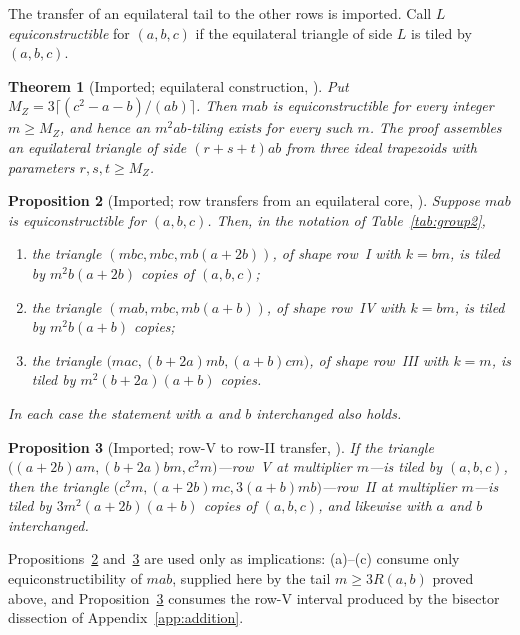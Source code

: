 \documentclass[11pt]{amsart}
\newtheorem{theorem}{Theorem}
\newtheorem{proposition}[theorem]{Proposition}
\theoremstyle{definition}
\theoremstyle{remark}
\begin{document}
The transfer of an equilateral tail to the other rows is imported.  Call
$L$ \emph{equiconstructible} for $(a,b,c)$ if the equilateral triangle of
side $L$ is tiled by $(a,b,c)$.

\begin{theorem}[Imported; equilateral construction,
{\cite[Thm.~4]{Zhang25}}]\label{thm:imp-zhang4}
Put $M_Z=3\lceil(c^2-a-b)/(ab)\rceil$.  Then $mab$ is equiconstructible for
every integer $m\ge M_Z$, and hence an $m^2ab$-tiling exists for every such
$m$.  The proof assembles an equilateral triangle of side $(r+s+t)ab$ from
three ideal trapezoids with parameters $r,s,t\ge M_Z$.
\end{theorem}

\begin{proposition}[Imported; row transfers from an equilateral core,
{\cite[Props.~8--10]{Zhang25}}]\label{prop:imp-zhang810}
Suppose $mab$ is equiconstructible for $(a,b,c)$.  Then, in the notation of
Table~\ref{tab:group2},
\begin{enumerate}[label=\textup{(\alph*)}]
\item \textup{\cite[Prop.~8(1)]{Zhang25}} the triangle
      $(mbc,mbc,mb(a+2b))$, of shape row~I with $k=bm$, is tiled by
      $m^2b(a+2b)$ copies of $(a,b,c)$;
\item \textup{\cite[Prop.~9(1)]{Zhang25}} the triangle
      $(mab,mbc,mb(a+b))$, of shape row~IV with $k=bm$, is tiled by
      $m^2b(a+b)$ copies;
\item \textup{\cite[Prop.~10(1)]{Zhang25}} the triangle
      $\bigl(mac,(b+2a)mb,(a+b)cm\bigr)$, of shape row~III with $k=m$, is
      tiled by $m^2(b+2a)(a+b)$ copies.
\end{enumerate}
In each case the statement with $a$ and $b$ interchanged also holds.
\end{proposition}

\begin{proposition}[Imported; row-V to row-II transfer,
{\cite[Prop.~11]{Zhang25}}]\label{prop:imp-zhang11}
If the triangle $\bigl((a+2b)am,(b+2a)bm,c^2m\bigr)$---row~V at multiplier
$m$---is tiled by $(a,b,c)$, then the triangle
$\bigl(c^2m,(a+2b)mc,3(a+b)mb\bigr)$---row~II at multiplier $m$---is tiled by
$3m^2(a+2b)(a+b)$ copies of $(a,b,c)$, and likewise with $a$ and $b$
interchanged.
\end{proposition}

\noindent Propositions~\ref{prop:imp-zhang810} and~\ref{prop:imp-zhang11}
are used only as implications: (a)--(c) consume only equiconstructibility of
$mab$, supplied here by the tail $m\ge3R(a,b)$ proved above, and
Proposition~\ref{prop:imp-zhang11} consumes the row-V interval produced by
the bisector dissection of Appendix~\ref{app:addition}.
\end{document}
